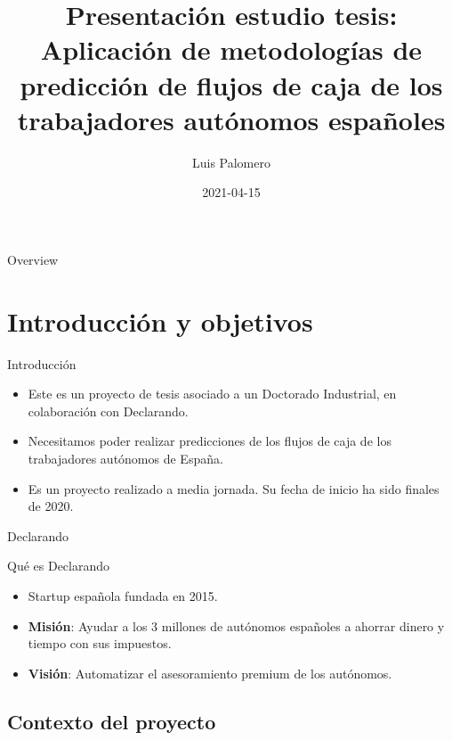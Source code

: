 \documentclass[12pt, aspectratio=169]{beamer} %
\title{Presentación estudio tesis: Aplicación de metodologías de predicción de flujos de caja de los trabajadores autónomos españoles}
\author{Luis Palomero}
\date{2021-04-15}
\begin{document}
\frame{\titlepage}


\begin{frame}{Overview}
\tableofcontents
\end{frame}

\section{Introducción y objetivos}

\begin{frame}{Introducción}
  \begin{itemize}
    \item Este es un proyecto de tesis asociado a un Doctorado Industrial, en colaboración con Declarando.
    \item Necesitamos poder realizar predicciones de los flujos de caja de los trabajadores autónomos de España.
    \item Es un proyecto realizado a media jornada. Su fecha de inicio ha sido finales de 2020.
  \end{itemize}

\end{frame}

\begin{frame}{Declarando}
  \begin{block}{Qué es Declarando}
    \begin{itemize}
    \item Startup española fundada en 2015.
    \item \textbf{Misión}: Ayudar a los 3 millones de autónomos españoles a ahorrar dinero y tiempo con sus impuestos.
    \item \textbf{Visión}: Automatizar el asesoramiento premium de los autónomos.
    \end{itemize}
  \end{block}
\end{frame}


\subsection{Contexto del proyecto}
\end{document}
